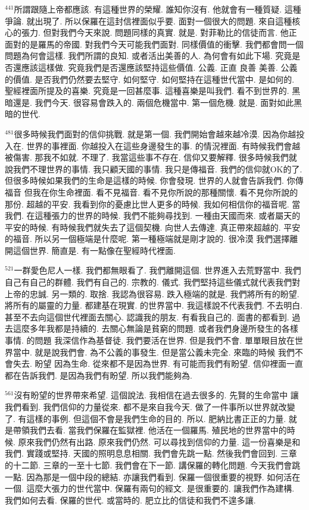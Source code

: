 \documentclass{book}
\begin{document}
$^{441}$所謂跟隨上帝都應該.
有這種世界的榮耀.
誰知你沒有.
他就會有一種質疑.
這種爭論.
就出現了.
所以保羅在這封信裡面似乎要.
面對一個很大的問題.
來自這種核心的張力.
但對我們今天來說.
問題同樣的真實.
就是.
對菲勒比的信徒而言.
他正面對的是羅馬的帝國.
對我們今天可能我們面對.
同樣價值的衝擊.
我們都會問一個問題為何會這樣.
我們所謂的良知.
或者活出美善的人.
為何會有如此下場.
究竟是否還應該這樣做.
究竟我們是否還應該堅持這些價值.
公義.
正直 良善 美善.
公義的價值.
是否我們仍然要去堅守.
如何堅守.
如何堅持在這種世代當中.
是如何的.
聖經裡面所提及的喜樂.
究竟是一回甚麼事.
這種喜樂是叫我們.
看不到世界的.
黑暗還是.
我們今天.
很容易會跌入的.
兩個危機當中.
第一個危機.
就是.
面對如此黑暗的世代.

$^{481}$很多時候我們面對的信仰挑戰.
就是第一個.
我們開始會越來越冷漠.
因為你越投入在.
世界的事裡面.
你越投入在這些身邊發生的事.
的情況裡面.
有時候我們會越被傷害.
那我不如就.
不理了.
我當這些事不存在.
信仰又要解釋.
很多時候我們就說我們不理世界的事情.
我只顧天國的事情.
我只是傳福音.
我們的信仰就OK的了.
但很多時候如果我們的生命是這樣的時候.
你會發現.
世界的人就會告訴我們.
你傳福音 但我在你生命裡面.
看不見福音.
看不見你所說的那種關懷.
看不見你所說的那份.
超越的平安.
我看到你的憂慮比世人更多的時候.
我如何相信你的福音呢.
當我們.
在這種張力的世界的時候.
我們不能夠尋找到.
一種由天國而來.
或者屬天的平安的時候.
有時候我們就失去了這個契機.
向世人去傳達.
真正帶來超越的.
平安的福音.
所以另一個極端是什麼呢.
第一種極端就是剛才說的.
很冷漠 我們選擇離開這個世界.
簡直是.
有一點像在聖經時代裡面.

$^{521}$一群愛色尼人一樣.
我們都無眼看了.
我們離開這個.
世界進入去荒野當中.
我們自己有自己的群體.
我們有自己的.
宗教的.
儀式.
我們堅持這些儀式就代表我們對上帝的忠誠.
另一類的.
取捨.
我認為很容易.
跌入極端的就是.
我們將所有的盼望.
將所有的屬靈的力量.
都建基在現實.
的世界當中.
我這樣說不代表我們.
不去明白.
甚至不去向這個世代裡面去關心.
認識我的朋友.
有看我自己的.
面書的都看到.
過去這麼多年我都是持續的.
去關心無論是貧窮的問題.
或者我們身邊所發生的各樣事情.
的問題 我深信作為基督徒.
我們要活在世界.
但是我們不會.
單單眼目放在世界當中.
就是說我們會.
為不公義的事發生.
但是當公義未完全.
來臨的時候 我們不會失去.
盼望 因為生命.
從來都不是因為世界.
有可能而我們有盼望.
信仰裡面一直都在告訴我們.
是因為我們有盼望.
所以我們能夠為.

$^{561}$沒有盼望的世界帶來希望.
這個說法.
我相信在過去很多的.
先賢的生命當中 讓我們看到.
我們信仰的力量從來.
都不是來自我今天.
做了一件事所以世界就改變了.
有這樣的事例.
但這個不會是我們生命的目的.
所以.
肥納比書正正的力量.
就是帶領我們去看.
當我們保羅在監獄裡.
他活在一個羅馬.
殖民地的世界當中的時候.
原來我們仍然有出路.
原來我們仍然.
可以尋找到信仰的力量.
這一份喜樂是和我們.
實踐或堅持.
天國的照明息息相關.
我們會先跳一點.
然後我們會回到.
三章的十二節.
三章的一至十七節.
我們會在下一節.
講保羅的轉化問題.
今天我們會跳一點.
因為那是一個中段的總結.
亦讓我們看到.
保羅一個很重要的視野.
如何活在一個.
這麼大張力的世代當中.
保羅有兩句的經文.
是很重要的.
讓我們作為建構.
我們如何去看.
保羅的世代.
或當時的.
肥立比的信徒和我們不遑多讓.
\end{document}
